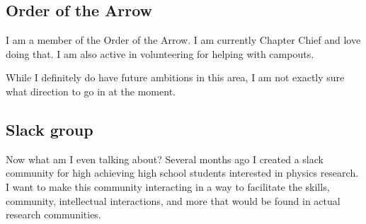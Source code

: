 \subsection{Order of the Arrow}
\par I am a member of the Order of the Arrow. I am currently Chapter Chief and love doing that. I am also active in volunteering for helping with campouts. 
\par While I definitely do have future ambitions in this area, I am not exactly sure what direction to go in at the moment.
\subsection{Slack group}
\par Now what am I even talking about? Several months ago I created a slack community for high achieving high school students interested in physics research. I want to make this community interacting in a way to facilitate the skills, community, intellectual interactions, and more that would be found in actual research communities.

